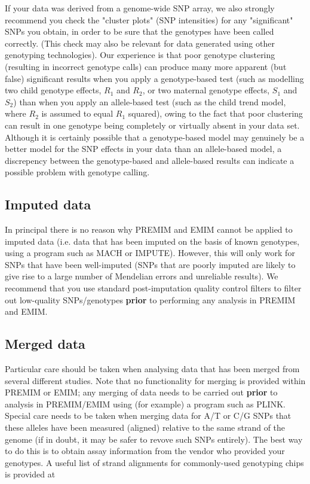 \documentclass[a4paper,12pt]{article}
\begin{document}
If your data was derived from a genome-wide SNP array, we also strongly recommend you check the "cluster plots" (SNP intensities) for any "significant" SNPs you obtain, in order to be sure that the genotypes have been called correctly. (This check may also be relevant for data generated using other genotyping technologies). Our experience is that poor genotype clustering (resulting in incorrect genotype calls) can produce many more apparent (but false) significant results when you apply a genotype-based test (such as modelling two child genotype effects, $R_1$ and $R_2$, or two maternal genotype effects, $S_1$ and $S_2$) than when you apply an allele-based test (such as the child trend model, where $R_2$ is assumed to equal $R_1$ squared), owing to the fact that poor clustering can result in one genotype being completely or virtually absent in your data set. Although it is certainly possible that a genotype-based model may genuinely be a better model for the SNP effects in your data than an allele-based model, a discrepency between the genotype-based and allele-based results can indicate a possible problem with genotype calling. 


\subsection{Imputed data}
\label{Imputed}

In principal there is no reason why PREMIM and EMIM cannot be applied to imputed data (i.e. data that has been imputed on the basis of known genotypes, using a program such as MACH or IMPUTE). However, this will only work for SNPs that have been well-imputed (SNPs that are poorly imputed are likely to give rise to a large number of Mendelian errors and unreliable results). We recommend that you use standard post-imputation quality control filters to filter out low-quality SNPs/genotypes {\bf prior} to performing any analysis in PREMIM and EMIM. 


\subsection{Merged data}
\label{Merged}

Particular care should be taken when analysing data that has been merged from several different studies. Note that no functionality for merging is provided within PREMIM or EMIM; any merging of data needs to be carried out {\bf prior} to analysis in PREMIM/EMIM using (for example) a program such as PLINK. Special care needs to be taken when merging data for A/T or C/G SNPs that these alleles have been measured (aligned) relative to the same strand of the genome (if in doubt, it may be safer to revove such SNPs entirely). The best way to do this is to obtain assay information from the vendor who provided your genotypes. A useful list of strand alignments for commonly-used genotyping chips is provided at 
\end{document}
